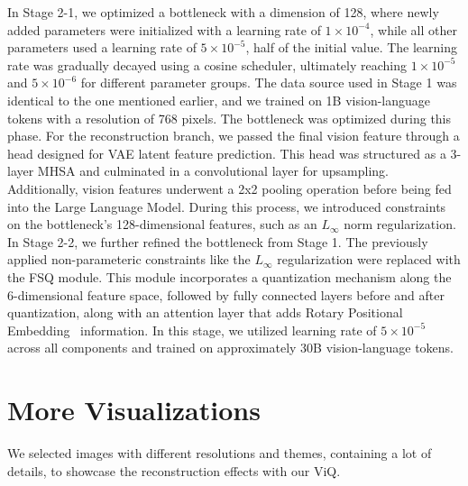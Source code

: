 In Stage 2-1, we optimized a bottleneck with a dimension of 128, where newly added parameters were initialized with a learning rate of $1\times 10^{-4}$, while all other parameters used a learning rate of $5\times 10^{-5}$, half of the initial value. The learning rate was gradually decayed using a cosine scheduler, ultimately reaching $1\times 10^{-5}$ and $5\times 10^{-6}$ for different parameter groups. The data source used in Stage 1 was identical to the one mentioned earlier, and we trained on 1B vision-language tokens with a resolution of 768 pixels. The bottleneck was optimized during this phase. For the reconstruction branch, we passed the final vision feature through a head designed for VAE latent feature prediction. This head was structured as a 3-layer MHSA and culminated in a convolutional layer for upsampling. Additionally, vision features underwent a 2x2 pooling operation before being fed into the Large Language Model. During this process, we introduced constraints on the bottleneck's 128-dimensional features, such as an $L_{\infty}$ norm regularization. In Stage 2-2, we further refined the bottleneck from Stage 1. The previously applied non-parameteric constraints like the $L_{\infty}$ regularization were replaced with the FSQ module. This module incorporates a quantization mechanism along the 6-dimensional feature space, followed by fully connected layers before and after quantization, along with an attention layer that adds Rotary Positional Embedding~\cite{su2024roformer} information. In this stage, we utilized learning rate of $5\times 10^{-5}$ across all components and trained on approximately 30B vision-language tokens.

\section{More Visualizations}
We selected images with different resolutions and themes, containing a lot of details, to showcase the reconstruction effects with our ViQ.
